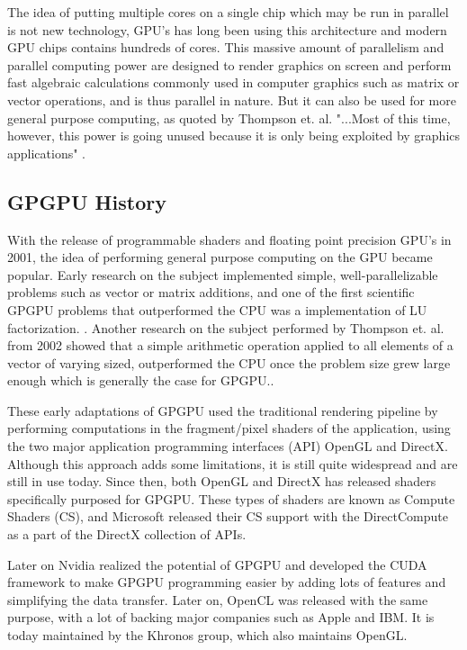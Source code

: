 The idea of putting multiple cores on a single chip which may be run in parallel is not new technology, GPU's has long been using this architecture and modern GPU chips contains hundreds of cores. This massive amount of parallelism and parallel computing power are designed to render graphics on screen and perform fast algebraic calculations commonly used in computer graphics such as matrix or vector operations, and is thus parallel in nature. But it can also be used for more general purpose computing, as quoted by Thompson et. al. "...Most of this time, however, this power is going unused because it is only
being exploited by graphics applications" \cite{thompson2002gpgpu}.


\subsection{GPGPU History}
With the release of programmable shaders and floating point precision GPU's in 2001, the idea of performing general purpose computing on the GPU became popular. Early research on the subject implemented simple, well-parallelizable problems such as vector or matrix additions, and one of the first scientific GPGPU problems that outperformed the CPU was a implementation of LU factorization. \cite{CUDAtoOpenCL}. Another research on the subject performed by Thompson et. al. from 2002 showed that a simple arithmetic operation applied to all elements of a vector of varying sized, outperformed the CPU once the problem size grew large enough which is generally the case for GPGPU.\cite{thompson2002gpgpu}.

These early adaptations of GPGPU used the traditional rendering pipeline by performing computations in the fragment/pixel shaders of the application, using the two major application programming interfaces (API) OpenGL and DirectX. Although this approach adds some limitations, it is still quite widespread and are still in use today. Since then, both OpenGL and DirectX has released shaders specifically purposed for GPGPU. These types of shaders are known as Compute Shaders (CS), and Microsoft released their CS support with the DirectCompute as a part of the DirectX collection of APIs.

Later on Nvidia realized the potential of GPGPU and developed the CUDA framework to make GPGPU programming easier by adding lots of features and simplifying the data transfer. Later on, OpenCL was released with the same purpose, with a lot of backing major companies such as Apple and IBM. It is today maintained by the Khronos group, which also maintains OpenGL.

